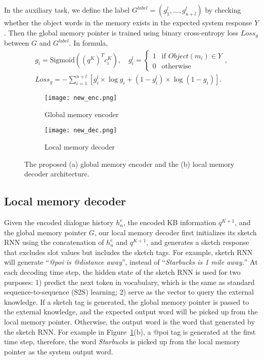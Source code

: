 \documentclass{article} \usepackage{iclr2019_conference,times}
\begin{document}
In the auxiliary task, we define the label $G^{label} = (g^l_1,\dots,g^l_{n+l})$ by checking whether the object words in the memory exists in the expected system response $Y$. Then the global memory pointer is trained using binary cross-entropy loss $Loss_{g}$ between $G$ and $G^{label}$. In formula,
\begin{equation}
    \begin{array}{c}
        g_i = \text{Sigmoid}((q^K)^T c^K_i), \quad 
        {g^l_i} = 
        \begin{cases} 
        1 &\mbox{if } Object(m_i) \in Y \\ 
        0 &\mbox{otherwise} 
        \end{cases}, \\
        Loss_g = -\sum_{i=1}^{n+l} [g^l_i \times \log{g_i}+(1-g^l_i) \times \log{(1-g_i)}]. 
    \end{array}
\end{equation}

\begin{figure}[t]
\begin{subfigure}{0.35\textwidth}
  \centering
  \texttt{[image: new\_enc.png]}
  \caption{Global memory encoder}
\end{subfigure}\begin{subfigure}{0.65\textwidth}
  \centering
  \texttt{[image: new\_dec.png]}
  \caption{Local memory decoder}
\end{subfigure}\caption{The proposed (a) global memory encoder and the (b) local memory decoder architecture. }
\label{FIG:MODEL2}
\end{figure}

\subsection{Local memory decoder}
Given the encoded dialogue history $h^e_n$, the encoded KB information $q^{K+1}$, and the global memory pointer $G$, our local memory decoder first initializes its sketch RNN using the concatenation of $h^e_n$ and $q^{K+1}$, and generates a sketch response that excludes slot values but includes the sketch tags. For example, sketch RNN will generate ``\textit{@poi is @distance away}'', instead of ``\textit{Starbucks is 1 mile away.}'' At each decoding time step, the hidden state of the sketch RNN is used for two purposes: 1) predict the next token in vocabulary, which is the same as standard sequence-to-sequence (S2S) learning; 2) serve as the vector to query the external knowledge. If a sketch tag is generated, the global memory pointer is passed to the external knowledge, and the expected output word will be picked up from the local memory pointer. Otherwise, the output word is the word that generated by the sketch RNN. For example in Figure~\ref{FIG:MODEL2}(b), a @poi tag is generated at the first time step, therefore, the word \textit{Starbucks} is picked up from the local memory pointer as the system output word.
\end{document}
